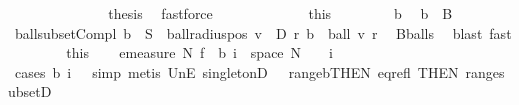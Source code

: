 \begin{isabellebody}
\ \ \ \ \ \ \isacommand{{\isacharbraceright}{\kern0pt}}\isamarkupfalse%
\isanewline
\ \ \ \ \ \ \isamarkupfalse%
\ {\isacharquery}{\kern0pt}thesis\ \isamarkupfalse%
\ fastforce\isanewline
\ \ \ \ \isamarkupfalse%
\isanewline
\ \ \isacommand{{\isacharbraceright}{\kern0pt}}\isamarkupfalse%
\isanewline
\ \ \isamarkupfalse%
\ {\isacharasterisk}{\kern0pt}\ {\isacharequal}{\kern0pt}\ this\isanewline
\ \ \isacommand{{\isacharbraceleft}{\kern0pt}}\isamarkupfalse%
\isanewline
\ \ \ \ \isamarkupfalse%
\ b{\isacharprime}{\kern0pt}\ \isamarkupfalse%
\ {\isachardoublequoteopen}b{\isacharprime}{\kern0pt}\ {\isasymin}\ B{\isachardoublequoteclose}\isanewline
\ \ \ \ \isamarkupfalse%
\ ball{\isacharunderscore}{\kern0pt}subset{\isacharunderscore}{\kern0pt}Compl{\isacharcolon}{\kern0pt}\ {\isachardoublequoteopen}b{\isacharprime}{\kern0pt}\ {\isasymsubseteq}\ {\isacharminus}{\kern0pt}S{\isachardoublequoteclose}\ \ ball{\isacharunderscore}{\kern0pt}radius{\isacharunderscore}{\kern0pt}pos{\isacharcolon}{\kern0pt}\ {\isachardoublequoteopen}{\isasymexists}v\ {\isasymin}\ D{\isachardot}{\kern0pt}\ {\isasymexists}r{\isachargreater}{\kern0pt}{}{\isachardot}{\kern0pt}\ b{\isacharprime}{\kern0pt}\ {\isacharequal}{\kern0pt}\ ball\ v\ r{\isachardoublequoteclose}\ \isamarkupfalse%
\ B{\isacharunderscore}{\kern0pt}balls\ \isamarkupfalse%
\ {\isacharparenleft}{\kern0pt}blast{\isacharcomma}{\kern0pt}\ fast{\isacharparenright}{\kern0pt}\isanewline
\ \ \isacommand{{\isacharbraceright}{\kern0pt}}\isamarkupfalse%
\isanewline
\ \ \isamarkupfalse%
\ {\isacharasterisk}{\kern0pt}{\isacharasterisk}{\kern0pt}\ {\isacharequal}{\kern0pt}\ this\isanewline
\ \ \isamarkupfalse%
\ {\isachardoublequoteopen}emeasure\ N\ {\isacharparenleft}{\kern0pt}f\ {\isacharminus}{\kern0pt}{\isacharbackquote}{\kern0pt}\ b\ i\ {\isasyminter}\ space\ N{\isacharparenright}{\kern0pt}\ {\isacharequal}{\kern0pt}\ {}{\isachardoublequoteclose}\ \ i\ \isamarkupfalse%
\ {\isacharparenleft}{\kern0pt}cases\ {\isachardoublequoteopen}b\ i\ {\isacharequal}{\kern0pt}\ {\isacharbraceleft}{\kern0pt}{\isacharbraceright}{\kern0pt}{\isachardoublequoteclose}{\isacharcomma}{\kern0pt}\ simp{\isacharparenright}{\kern0pt}\ {\isacharparenleft}{\kern0pt}metis\ UnE\ singletonD\ \ {\isacharasterisk}{\kern0pt}\ range{\isacharunderscore}{\kern0pt}b{\isacharbrackleft}{\kern0pt}THEN\ eq{\isacharunderscore}{\kern0pt}refl{\isacharcomma}{\kern0pt}\ THEN\ range{\isacharunderscore}{\kern0pt}subsetD{\isacharbrackright}{\kern0pt}{\isacharparenright}{\kern0pt}\isanewline

\end{isabellebody}
